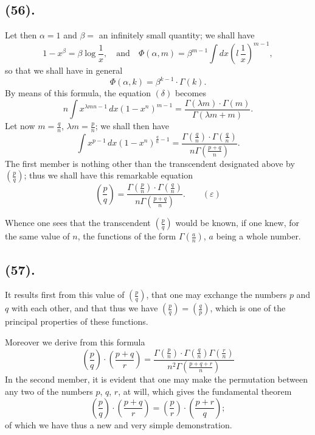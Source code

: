 \documentclass{article}
\begin{document}
\subsection*{(56).}

Let then $\alpha=1$ and $\beta=$ an infinitely small quantity; we shall have
\[ 1-x^{\beta}=\beta\log\frac{1}{x},\quad\text{and}\quad\Phi(\alpha,m)=\beta^{m-1}\int dx\left(l\,\frac{1}{x}\right)^{m-1}, \]
so that we shall have in general
\[ \Phi(\alpha,k)=\beta^{k-1}\cdot\Gamma(k). \]
By means of this formula, the equation $(\delta)$ becomes
\[ n\int x^{\lambda mn-1}\,dx(1-x^{n})^{m-1}=\frac{\Gamma(\lambda m)\cdot\Gamma(m)}{\Gamma(\lambda m+m)}. \]
Let now $m=\frac{q}{n}$, $\lambda m=\frac{p}{n}$; we shall then have
\[ \int x^{p-1}\,dx(1-x^{n})^{\frac{q}{n}-1}=\frac{\Gamma\left(\frac{q}{n}\right)\cdot\Gamma\left(\frac{q}{n}\right)}{n\Gamma\left(\frac{p+q}{n}\right)}. \]
The first member is nothing other than the transcendent designated above by $\left(\frac{p}{q}\right)$; thus we shall have this remarkable equation
\[ \left(\frac{p}{q}\right)=\frac{\Gamma\left(\frac{p}{n}\right)\cdot\Gamma\left(\frac{q}{n}\right)}{n\Gamma\left(\frac{p+q}{n}\right)}.\qquad(\varepsilon) \]

Whence one sees that the transcendent $\left(\frac{p}{q}\right)$ would be known, if one knew, for the same value of $n$, the functions of the form $\Gamma\left(\frac{a}{n}\right)$, $a$ being a whole number.

\subsection*{(57).}

It results first from this value of $\left(\frac{p}{q}\right)$, that one may exchange the numbers $p$ and $q$ with each other, and that thus we have $\left(\frac{p}{q}\right)=\left(\frac{q}{p}\right)$, which is one of the principal properties of these functions.

Moreover we derive from this formula
\[ \left(\frac{p}{q}\right)\cdot\left(\frac{p+q}{r}\right)=\frac{\Gamma\left(\frac{p}{n}\right)\cdot\Gamma\left(\frac{q}{n}\right)\Gamma\left(\frac{r}{n}\right)}{n^{2}\Gamma\left(\frac{p+q+r}{n}\right)} \]
In the second member, it is evident that one may make the permutation between any two of the numbers $p$, $q$, $r$, at will, which gives the fundamental theorem
\[ \left(\frac{p}{q}\right)\cdot\left(\frac{p+q}{r}\right)=\left(\frac{p}{r}\right)\cdot\left(\frac{p+r}{q}\right); \]
of which we have thus a new and very simple demonstration.
\end{document}
